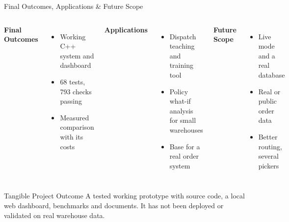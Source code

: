 \documentclass[aspectratio=169,11pt]{beamer}
\begin{document}
\begin{frame}{Final Outcomes, Applications \& Future Scope}
\footnotesize
\begin{columns}[T,totalwidth=\textwidth]
\textbf{\color{GEUBlue}Final Outcomes}
\begin{itemize}\itemsep3pt
    \item Working C++ system and dashboard
    \item 68 tests, 793 checks passing
    \item Measured comparison with its costs
\end{itemize}
\textbf{\color{GEUBlue}Applications}
\begin{itemize}\itemsep3pt
    \item Dispatch teaching and training tool
    \item Policy what-if analysis for small warehouses
    \item Base for a real order system
\end{itemize}
\textbf{\color{GEUBlue}Future Scope}
\begin{itemize}\itemsep3pt
    \item Live mode and a real database
    \item Real or public order data
    \item Better routing, several pickers
\end{itemize}
\end{columns}
\vspace{5mm}
\begin{block}{Tangible Project Outcome}
A tested working prototype with source code, a local web dashboard, benchmarks and documents. It has not been deployed or validated on real warehouse data.
\end{block}
\end{frame}
\end{document}
